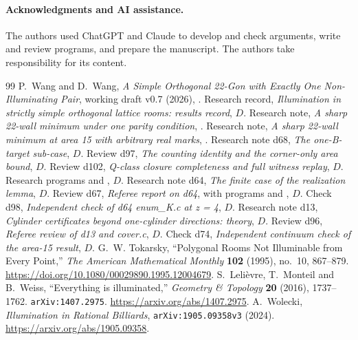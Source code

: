 \documentclass[11pt]{article}
\theoremstyle{definition}
\theoremstyle{remark}
\begin{document}
\paragraph{Acknowledgments and AI assistance.}
The authors used ChatGPT and Claude to develop and check arguments, write
and review programs, and prepare the manuscript. The authors take
responsibility for its content.

\begin{thebibliography}{99}
P.~Wang and D.~Wang, \emph{A Simple Orthogonal 22-Gon with Exactly One
Non-Illuminating Pair}, working draft v0.7 (2026),
.
Research record, \emph{Illumination in strictly simple orthogonal lattice
rooms: results record}, $D$.
Research note, \emph{A sharp 22-wall minimum under one parity condition},
.
Research note, \emph{A sharp 22-wall minimum at area 15 with arbitrary
real marks}, .
Research note d68, \emph{The one-B-target sub-case},
$D$.
Review d97, \emph{The counting identity and the corner-only area bound},
$D$.
Review d102, \emph{Q-class closure completeness and full witness replay},
$D$.
Research programs  and ,
$D$.
Research note d64, \emph{The finite case of the realization lemma},
$D$.
Review d67, \emph{Referee report on d64}, with programs 
and , $D$.
Check d98, \emph{Independent check of d64 enum\_K.c at z = 4},
$D$.
Research note d13, \emph{Cylinder certificates beyond one-cylinder
directions: theory}, $D$.
Review d96, \emph{Referee review of d13 and cover.c},
$D$.
Check d74, \emph{Independent continuum check of the area-15 result},
$D$.
G.~W. Tokarsky, ``Polygonal Rooms Not Illuminable from Every Point,''
\emph{The American Mathematical Monthly} \textbf{102} (1995), no.~10,
867--879. \url{https://doi.org/10.1080/00029890.1995.12004679}.
S.~Leli\`evre, T.~Monteil and B.~Weiss, ``Everything is illuminated,''
\emph{Geometry \& Topology} \textbf{20} (2016), 1737--1762.
\texttt{arXiv:1407.2975}. \url{https://arxiv.org/abs/1407.2975}.
A.~Wolecki, \emph{Illumination in Rational Billiards},
\texttt{arXiv:1905.09358v3} (2024). \url{https://arxiv.org/abs/1905.09358}.
\end{thebibliography}
\end{document}
